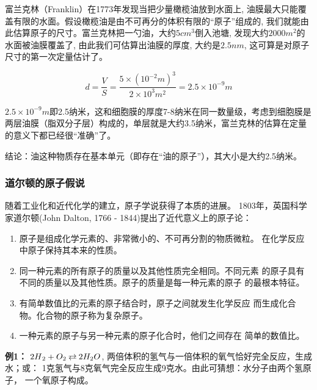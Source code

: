 
富兰克林（Franklin）在1773年发现当把少量橄榄油放到水面上,
油膜最大只能覆盖有限的水面。假设橄榄油是由不可再分的体积有限的“原子”组成的,
我们就能由此估算原子的尺寸。富兰克林把一勺油，大约$5 cm^3$倒入池塘,
发现大约$2000 m^2$的水面被油膜覆盖了, 由此我们可估算出油膜的厚度,
大约是$2.5 nm$, 这可算是对原子尺寸的第一次定量估计了。

\begin{equation}
 d = \frac{V}{S} = \frac{{5 \times \left( {10^{ - 2} m} \right)^3
}}{{2 \times 10^3 m^2 }} = 2.5 \times 10^{ - 9} m
\end{equation}

$2.5 \times 10^{-9} m$即2.5纳米，这和细胞膜的厚度7-8纳米在同一数量级，考虑到细胞膜是两层油膜（脂双分子层）构成的，单层就是大约3.5纳米，富兰克林的估算在定量的意义下都已经很“准确”了。

结论：油这种物质存在基本单元（即存在“油的原子”），其大小是大约2.5纳米。

\subsubsection{道尔顿的原子假说}

随着工业化和近代化学的建立，原子学说获得了本质的进展。
1803年，英国科学家道尔顿(John Dalton, 1766 -
1844)提出了近代意义上的原子论：


\begin{enumerate}

\item{ 原子是组成化学元素的、非常微小的、不可再分割的物质微粒。
在化学反应中原子保持其本来的性质。}

\item{ 同一种元素的所有原子的质量以及其他性质完全相同。不同元素
的原子具有不同的质量以及其他性质。原子的质量是每一种元素的原子
的最根本特征。}

\item{ 有简单数值比的元素的原子结合时，原子之间就发生化学反应
而生成化合物。化合物的原子称为复杂原子。}

\item{ 一种元素的原子与另一种元素的原子化合时，他们之间存在
简单的数值比。}

\end{enumerate}

{\bf 例1：} $2H{}_2 + O_2
\mathbin{\lower.3ex\hbox{$\buildrel\textstyle\rightarrow\over
{\smash{\leftarrow}\vphantom{_{\vbox to.5ex{\vss}}}}$}} 2H_2 O$,
两倍体积的氢气与一倍体积的氧气恰好完全反应，生成水；或：
1克氢气与8克氧气完全反应生成9克水。由此可猜想：水分子由两个氢原子，
一个氧原子构成。



